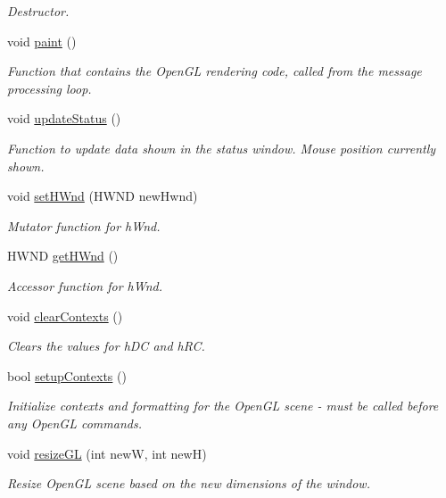 \begin{DoxyCompactItemize}
\begin{DoxyCompactList}\small\item\em Destructor. \end{DoxyCompactList}\item 
void \hyperlink{class_viewer3_d_a12869c54575f354e074d2a877ea53eb0}{paint} ()
\begin{DoxyCompactList}\small\item\em Function that contains the OpenGL rendering code, called from the message processing loop. \end{DoxyCompactList}\item 
void \hyperlink{class_viewer3_d_a4f1896e96be5588313145183b245b216}{updateStatus} ()
\begin{DoxyCompactList}\small\item\em Function to update data shown in the status window. Mouse position currently shown. \end{DoxyCompactList}\item 
void \hyperlink{class_viewer3_d_ac088e6c9eebec8f7a34928e7e7e73595}{setHWnd} (HWND newHwnd)
\begin{DoxyCompactList}\small\item\em Mutator function for hWnd. \end{DoxyCompactList}\item 
HWND \hyperlink{class_viewer3_d_a07493f5ff13ff91bd30e01d4b8f01748}{getHWnd} ()
\begin{DoxyCompactList}\small\item\em Accessor function for hWnd. \end{DoxyCompactList}\item 
void \hyperlink{class_viewer3_d_a0149ba7c00c25ae9de7ea98b62a4f9b4}{clearContexts} ()
\begin{DoxyCompactList}\small\item\em Clears the values for hDC and hRC. \end{DoxyCompactList}\item 
bool \hyperlink{class_viewer3_d_acdd037bb0612c8c589c1b14d77c3f00c}{setupContexts} ()
\begin{DoxyCompactList}\small\item\em Initialize contexts and formatting for the OpenGL scene -\/ must be called before any OpenGL commands. \end{DoxyCompactList}\item 
void \hyperlink{class_viewer3_d_a2bd9c82cf451ba7daecbd9bb58517424}{resizeGL} (int newW, int newH)
\begin{DoxyCompactList}\small\item\em Resize OpenGL scene based on the new dimensions of the window. \end{DoxyCompactList}\end{DoxyCompactItemize}
